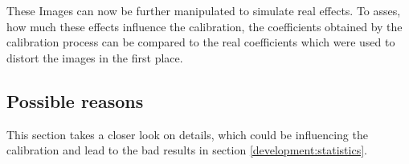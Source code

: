 These Images can now be further manipulated to simulate real effects.
To asses, how much these effects influence the calibration, the coefficients obtained by the calibration process can be compared to the real coefficients which were used to distort the images in the first place.

\subsection{Possible reasons}
This section takes a closer look on details, which could be influencing the calibration and lead to the bad results in section \ref{development:statistics}.
  
